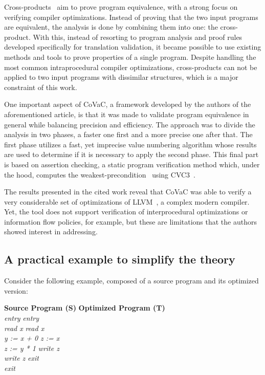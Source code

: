 Cross-products~\cite{DBLP:conf/fm/ZaksP08} aim to prove program equivalence, with a strong focus on verifying compiler optimizations.
Instead of proving that the two input programs are equivalent, the analysis is done by combining them into one: the cross-product.
With this, instead of resorting to program analysis and proof rules developed specifically for translation validation, it became possible to use existing methods and tools to prove properties of a single program. 
Despite handling the most common intraprocedural compiler optimizations, cross-products can not be applied to two input programs with dissimilar structures, which is a major constraint of this work.

One important aspect of CoVaC, a framework developed by the authors of the aforementioned article, is that it was made to validate program equivalence in general while balancing precision and efficiency.
The approach was to divide the analysis in two phases, a faster one first and a more precise one after that.
The first phase utilizes a fast, yet imprecise value numbering algorithm whose results are used to determine if it is necessary to apply the second phase. 
This final part is based on assertion checking, a static program verification method which, under the hood, computes the weakest-precondition~\cite{DBLP:books/ph/Dijkstra76} using CVC3~\cite{cvc3}. 

The results presented in the cited work reveal that CoVaC was able to verify a very considerable set of optimizations of LLVM~\cite{llvm}, a complex modern compiler.
Yet, the tool does not support verification of interprocedural optimizations or information flow policies, for example, but these are limitations that the authors showed interest in addressing.


\subsection{A practical example to simplify the theory} 
\label{subsec:cross_products_ex}

Consider the following example, composed of a source program and its optimized version:

\begin{tabbing}
  \hspace{2cm}\= \textbf{Source Program (S)} \hspace{2cm} \= \textbf{Optimized Program (T)} \\ 
  \> \emph{entry} \> \emph{entry} \\
  \> \emph{  read x} \> \emph{  read x} \\
  \> \emph{  y := x + 0} \> \emph{  z := x} \\
  \> \emph{  z := y * 1} \> \emph{  write z} \\
  \> \emph{  write z} \> \emph{exit} \\
  \> \emph{exit} \> \emph{} 
  \label{tabbing:cross_products_example_code}
\end{tabbing}

